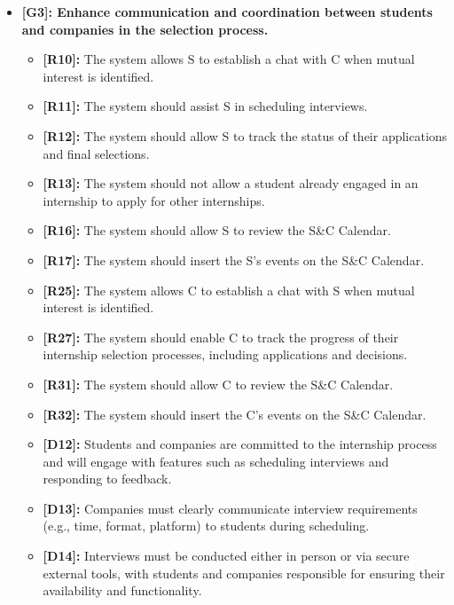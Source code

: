 \begin{itemize}
\item
  \textbf{[G3]: Enhance communication and coordination between
  students and companies in the selection process.}

  \begin{itemize}
  \item
    \textbf{[R10]:} The system allows S to establish a chat with C when
    mutual interest is identified.
  \item
    \textbf{[R11]:} The system should assist S in scheduling interviews.
  \item
    \textbf{[R12]:} The system should allow S to track the status of their applications and final selections.
  \item
    \textbf{[R13]:} The system should not allow a student already engaged in an internship to apply for other internships.
  \item
    \textbf{[R16]:} The system should allow S to review the S\&C Calendar.
  \item
    \textbf{[R17]:} The system should insert the S's events on the S\&C
    Calendar.
  \item
    \textbf{[R25]:} The system allows C to establish a chat with S when
    mutual interest is identified.
  \item
    \textbf{[R27]:} The system should enable C to track the progress of their internship selection processes, including applications and
    decisions.
  \item
    \textbf{[R31]:} The system should allow C to review the S\&C Calendar.
  \item
    \textbf{[R32]:} The system should insert the C's events on the S\&C
    Calendar.
  \item
    \textbf{[D12]:} Students and companies are committed to the internship process and will engage with features such as scheduling interviews and responding to feedback.
  \item
    \textbf{[D13]:} Companies must clearly communicate interview requirements (e.g., time, format, platform) to students during scheduling.
  \item
    \textbf{[D14]:} Interviews must be conducted either in person or via
    secure external tools, with students and companies responsible for
    ensuring their availability and functionality.
  \end{itemize}
\end{itemize}

